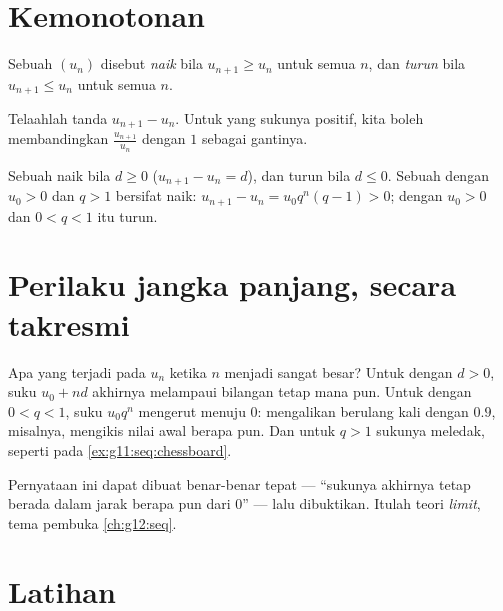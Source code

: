 \section{Kemonotonan}

\begin{definition}\label{def:g11:seq:monotone}
Sebuah  $(u_n)$ disebut \emph{naik} bila $u_{n+1} \geq u_n$ untuk
semua $n$, dan \emph{turun} bila $u_{n+1} \leq u_n$ untuk semua $n$.
\end{definition}

\begin{method}\label{met:g11:seq:monotonicity}
Telaahlah tanda $u_{n+1} - u_n$. Untuk  yang sukunya positif, kita
boleh membandingkan $\frac{u_{n+1}}{u_n}$ dengan $1$ sebagai gantinya.
\end{method}

\begin{example}
Sebuah  naik bila $d \geq 0$
($u_{n+1} - u_n = d$), dan turun bila $d \leq 0$. Sebuah 
dengan $u_0 > 0$ dan $q > 1$ bersifat naik:
$u_{n+1} - u_n = u_0 q^n (q - 1) > 0$; dengan $u_0 > 0$ dan $0 < q < 1$
 itu turun.
\end{example}

\section{Perilaku jangka panjang, secara takresmi}

Apa yang terjadi pada $u_n$ ketika $n$ menjadi sangat besar? Untuk  dengan $d > 0$, suku $u_0 + nd$ akhirnya melampaui bilangan tetap
mana pun. Untuk  dengan $0 < q < 1$, suku
$u_0 q^n$ mengerut menuju $0$: mengalikan berulang kali dengan $0.9$, misalnya,
mengikis nilai awal berapa pun. Dan untuk $q > 1$ sukunya meledak, seperti pada
\cref{ex:g11:seq:chessboard}.

\begin{remark}
Pernyataan ini dapat dibuat benar-benar tepat --- ``sukunya akhirnya
tetap berada dalam jarak berapa pun dari $0$'' --- lalu dibuktikan. Itulah teori
\emph{limit}, tema pembuka \cref{ch:g12:seq}.
\end{remark}

\section{Latihan}


